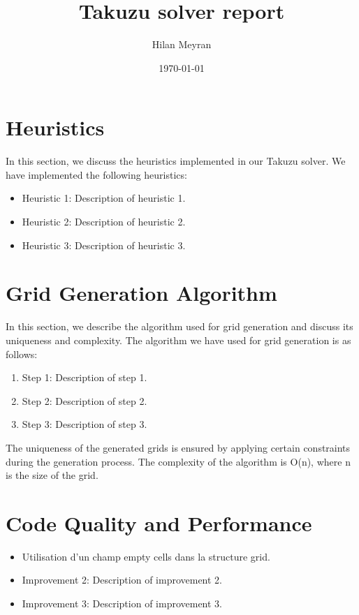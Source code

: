\documentclass{article}
\begin{document}
\title{Takuzu solver report}
\author{Hilan Meyran}
\date{\today}

\maketitle

\section{Heuristics}

In this section, we discuss the heuristics implemented in our Takuzu solver. We have implemented the following heuristics:

\begin{itemize}
  \item Heuristic 1: Description of heuristic 1.
  \item Heuristic 2: Description of heuristic 2.
  \item Heuristic 3: Description of heuristic 3.
\end{itemize}

\section{Grid Generation Algorithm}

In this section, we describe the algorithm used for grid generation and discuss its uniqueness and complexity. The algorithm we have used for grid generation is as follows:

\begin{enumerate}
  \item Step 1: Description of step 1.
  \item Step 2: Description of step 2.
  \item Step 3: Description of step 3.
\end{enumerate}

The uniqueness of the generated grids is ensured by applying certain constraints during the generation process. The complexity of the algorithm is O(n), where n is the size of the grid.

\section{Code Quality and Performance}

\begin{itemize}
  \item Utilisation d'un champ empty cells dans la structure grid.
  \item Improvement 2: Description of improvement 2.
  \item Improvement 3: Description of improvement 3.
\end{itemize}
\end{document}
